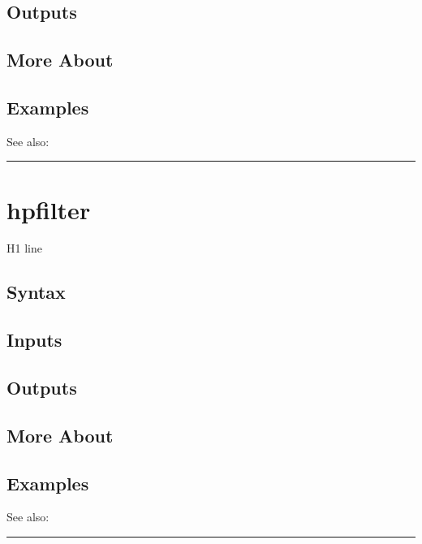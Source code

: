 \documentclass[letterpaper,10pt,english]{sphinxmanual}
\begin{document}
\subsection{Outputs}
\label{classes/time_series/@ts/ts:id268}

\subsection{More About}
\label{classes/time_series/@ts/ts:id269}

\subsection{Examples}
\label{classes/time_series/@ts/ts:id270}
See also:


\bigskip\hrule{}\bigskip



\section{hpfilter}
\label{classes/time_series/@ts/ts:id271}\label{classes/time_series/@ts/ts:hpfilter}
H1 line


\subsection{Syntax}
\label{classes/time_series/@ts/ts:id272}

\subsection{Inputs}
\label{classes/time_series/@ts/ts:id273}

\subsection{Outputs}
\label{classes/time_series/@ts/ts:id274}

\subsection{More About}
\label{classes/time_series/@ts/ts:id275}

\subsection{Examples}
\label{classes/time_series/@ts/ts:id276}
See also:


\bigskip\hrule{}\bigskip
\end{document}
